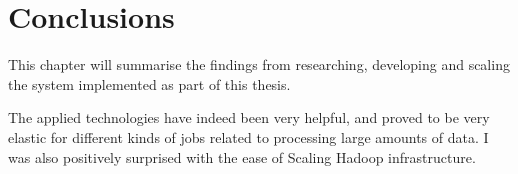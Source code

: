 \chapter{Conclusions}
\label{chap:conclusions}

This chapter will summarise the findings from researching, developing and scaling the system implemented as part of this thesis.

The applied technologies have indeed been very helpful, and proved to be very elastic for different kinds of jobs related to processing large amounts of data. I was also positively surprised with the ease of Scaling Hadoop infrastructure.

